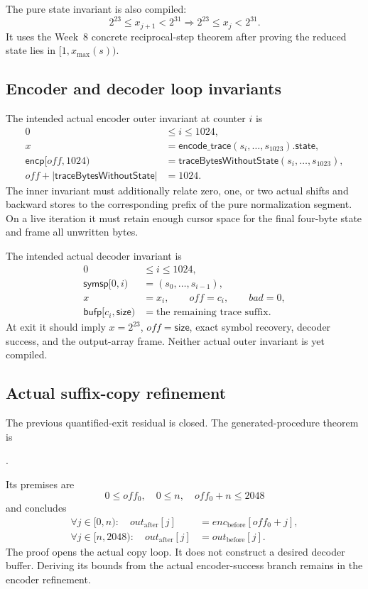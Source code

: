 The pure state invariant is also compiled:
\[
  2^{23}\leq x_{j+1}<2^{31}
  \Longrightarrow
  2^{23}\leq x_j<2^{31}.
\]
It uses the Week~8 concrete reciprocal-step theorem after proving the reduced
state lies in $[1,x_{\max}(s))$.

\subsection*{Encoder and decoder loop invariants}

The intended actual encoder outer invariant at counter $i$ is
\[
\begin{aligned}
  0&\leq i\leq1024,\\
  x&=\mathsf{encode\_trace}(s_i,\ldots,s_{1023}).\mathsf{state},\\
  \mathsf{encp}[off,1024)
    &=\mathsf{traceBytesWithoutState}(s_i,\ldots,s_{1023}),\\
  off+\lvert\mathsf{traceBytesWithoutState}\rvert&=1024.
\end{aligned}
\]
The inner invariant must additionally relate zero, one, or two actual shifts
and backward stores to the corresponding prefix of the pure normalization
segment. On a live iteration it must retain enough cursor space for the final
four-byte state and frame all unwritten bytes.

The intended actual decoder invariant is
\[
\begin{aligned}
  0&\leq i\leq1024,\\
  \mathsf{symsp}[0,i)&=(s_0,\ldots,s_{i-1}),\\
  x&=x_i,\qquad off=c_i,\qquad bad=0,\\
  \mathsf{bufp}[c_i,\mathsf{size})&=\text{the remaining trace suffix}.
\end{aligned}
\]
At exit it should imply $x=2^{23}$, $off=\mathsf{size}$, exact symbol recovery,
decoder success, and the output-array frame. Neither actual outer invariant is
yet compiled.

\subsection*{Actual suffix-copy refinement}

The previous quantified-exit residual is closed. The generated-procedure
theorem is
\begin{center}
  .
\end{center}
Its premises are
\[
  0\leq off_0,\quad0\leq n,\quad off_0+n\leq2048
\]
and concludes
\[
\begin{aligned}
  \forall j\in[0,n):\quad
    out_{\mathrm{after}}[j]&=enc_{\mathrm{before}}[off_0+j],\\
  \forall j\in[n,2048):\quad
    out_{\mathrm{after}}[j]&=out_{\mathrm{before}}[j].
\end{aligned}
\]
The proof opens the actual copy loop. It does not construct a desired decoder
buffer. Deriving its bounds from the actual encoder-success branch remains in
the encoder refinement.

